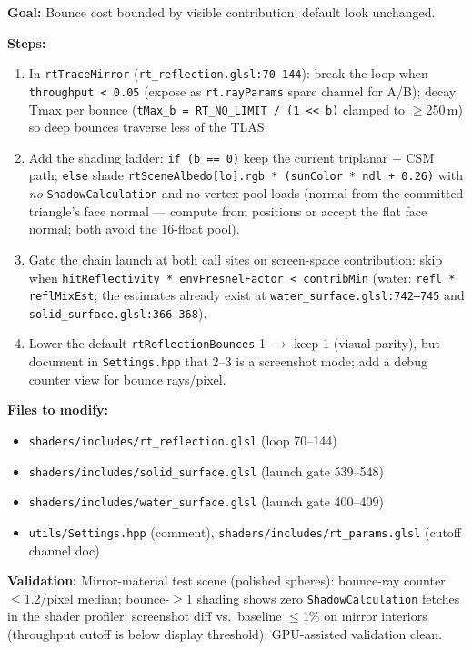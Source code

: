 \documentclass[11pt,a4paper]{article}
\begin{document}
\begin{tcolorbox}[promptbox={Prompt: Bound Mirror Bounce Fan-Out with Throughput and Shading Decay}]
\textbf{Goal:} Bounce cost bounded by visible contribution; default look unchanged.

\textbf{Steps:}
\begin{enumerate}
    \item In \texttt{rtTraceMirror} (\texttt{rt\_reflection.glsl:70--144}): break the loop when \texttt{throughput < 0.05} (expose as \texttt{rt.rayParams} spare channel for A/B); decay Tmax per bounce (\texttt{tMax\_b = RT\_NO\_LIMIT / (1 << b)} clamped to $\geq$250\,m) so deep bounces traverse less of the TLAS.
    \item Add the shading ladder: \texttt{if (b == 0)} keep the current triplanar $+$ CSM path; \texttt{else} shade \texttt{rtSceneAlbedo[lo].rgb * (sunColor * ndl + 0.26)} with \emph{no} \texttt{ShadowCalculation} and no vertex-pool loads (normal from the committed triangle's face normal --- compute from positions or accept the flat face normal; both avoid the 16-float pool).
    \item Gate the chain launch at both call sites on screen-space contribution: skip when \texttt{hitReflectivity * envFresnelFactor < contribMin} (water: \texttt{refl * reflMixEst}; the estimates already exist at \texttt{water\_surface.glsl:742--745} and \texttt{solid\_surface.glsl:366--368}).
    \item Lower the default \texttt{rtReflectionBounces} 1 $\rightarrow$ keep 1 (visual parity), but document in \texttt{Settings.hpp} that 2--3 is a screenshot mode; add a debug counter view for bounce rays/pixel.
\end{enumerate}

\textbf{Files to modify:}
\begin{itemize}
    \item \texttt{shaders/includes/rt\_reflection.glsl} (loop 70--144)
    \item \texttt{shaders/includes/solid\_surface.glsl} (launch gate 539--548)
    \item \texttt{shaders/includes/water\_surface.glsl} (launch gate 400--409)
    \item \texttt{utils/Settings.hpp} (comment), \texttt{shaders/includes/rt\_params.glsl} (cutoff channel doc)
\end{itemize}

\textbf{Validation:} Mirror-material test scene (polished spheres): bounce-ray counter $\leq$1.2/pixel median; bounce-$\geq$1 shading shows zero \texttt{ShadowCalculation} fetches in the shader profiler; screenshot diff vs.\ baseline $\leq$1\% on mirror interiors (throughput cutoff is below display threshold); GPU-assisted validation clean.
\end{tcolorbox}
\end{document}
